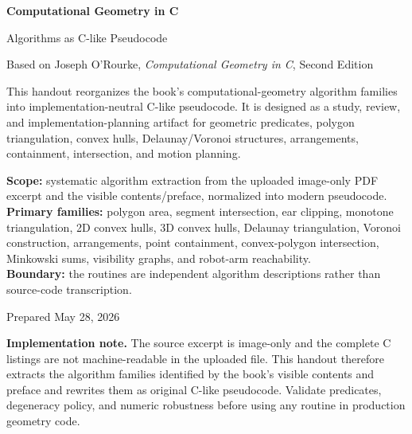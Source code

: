 \documentclass[11pt]{article}
\begin{document}
\hypersetup{pageanchor=false}

\begin{titlepage}
  \centering
  \vspace*{1.55cm}
  {\Huge\bfseries\color{CGBlue}Computational Geometry in C\par}
  \vspace{0.35cm}
  {\LARGE Algorithms as C-like Pseudocode\par}
  \vspace{0.25cm}
  {\large Based on Joseph O'Rourke, \textit{Computational Geometry in C}, Second Edition\par}
  \vspace{0.95cm}
  \begin{scopebox}
  This handout reorganizes the book's computational-geometry algorithm families into implementation-neutral C-like pseudocode. It is designed as a study, review, and implementation-planning artifact for geometric predicates, polygon triangulation, convex hulls, Delaunay/Voronoi structures, arrangements, containment, intersection, and motion planning.
  \end{scopebox}
  \vspace{0.70cm}
  \begin{methodbox}
  \textbf{Scope:} systematic algorithm extraction from the uploaded image-only PDF excerpt and the visible contents/preface, normalized into modern pseudocode.\\
  \textbf{Primary families:} polygon area, segment intersection, ear clipping, monotone triangulation, 2D convex hulls, 3D convex hulls, Delaunay triangulation, Voronoi construction, arrangements, point containment, convex-polygon intersection, Minkowski sums, visibility graphs, and robot-arm reachability.\\
  \textbf{Boundary:} the routines are independent algorithm descriptions rather than source-code transcription.
  \end{methodbox}
  \vfill
  {\large Prepared May 28, 2026\par}
\end{titlepage}

\hypersetup{pageanchor=true}
\tableofcontents
\clearpage
{}

\begin{warningbox}
\textbf{Implementation note.} The source excerpt is image-only and the complete C listings are not machine-readable in the uploaded file. This handout therefore extracts the algorithm families identified by the book's visible contents and preface and rewrites them as original C-like pseudocode. Validate predicates, degeneracy policy, and numeric robustness before using any routine in production geometry code.
\end{warningbox}
\end{document}
